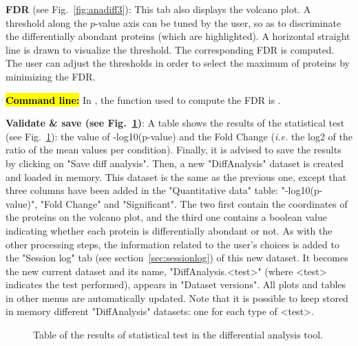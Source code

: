 \documentclass[12pt]{article}
\begin{document}
\textbf{FDR} (see Fig.~\ref{fig:anadiff3}): This tab also displays the 
volcano plot. A threshold along the $p$-value axis can be tuned by the user, 
so as to discriminate the differentially abondant proteins (which are 
highlighted). A horizontal straight line is drawn to visualize the threshold. 
The corresponding FDR is computed. The user can adjust the thresholds in 
order to select the maximum of proteins by minimizing the FDR.


\hl{\bf Command line:} In , the function used to compute the 
FDR is .


\textbf{Validate \& save (see Fig.~\ref{fig:anadiff4})}: 
A table shows the results of the statistical test (see 
Fig.~\ref{fig:anadiff4}): the value of -log10(p-value) and the Fold Change 
(\emph{i.e.} the log2 of the ratio of the mean values per condition). Finally, 
it is advised to save the results by clicking on "Save diff analysis". Then, 
a new "DiffAnalysis" dataset is created and loaded in memory. This dataset 
is the same as the previous one, except that three columns have been added in 
the "Quantitative data" table: "-log10(p-value)",  "Fold Change" and 
"Significant". The two first contain the coordinates of the proteins on the 
volcano plot, and the third one contains a boolean value indicating whether 
each protein is differentially abondant or not. As with the other processing 
steps, the information related to the user's choices is added to the 
"Session log" tab (see section~\ref{sec:sessionlog}) of this new dataset.
It becomes the new current dataset and its name, "DiffAnalysis.<test>" (where 
<test> indicates the test performed), appears in "Dataset versions". All 
plots and tables in other menus are automatically updated. Note that it is 
possible to keep stored in memory different "DiffAnalysis" datasets: one for 
each type of <test>.


\begin{figure}
\centering
{}
\caption{Table of the results of statistical test in the differential 
analysis tool.}\label{fig:anadiff4}
\end{figure}
\end{document}

